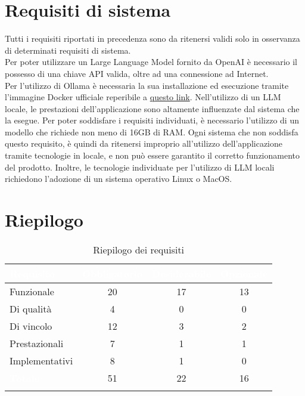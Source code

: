 \section{Requisiti di sistema}
Tutti i requisiti riportati in precedenza sono da ritenersi validi solo in osservanza di determinati requisiti di sistema.\\
Per poter utilizzare un Large Language Model fornito da OpenAI è necessario il possesso di una chiave API valida, oltre ad una connessione ad Internet.\\
Per l'utilizzo di Ollama è necessaria la sua installazione ed esecuzione tramite l'immagine Docker ufficiale reperibile a \href{https://ollama.ai/blog/ollama-is-now-available-as-an-official-docker-image}{questo link}.
Nell'utilizzo di un LLM locale, le prestazioni dell'applicazione sono altamente influenzate dal sistema che la esegue. Per poter soddisfare i requisiti individuati, è necessario l'utilizzo di un modello che richiede non meno di 16GB di RAM. Ogni sistema che non soddisfa questo requisito, è quindi da ritenersi improprio all'utilizzo dell'applicazione tramite tecnologie in locale, e non può essere garantito il corretto funzionamento del prodotto. Inoltre, le tecnologie individuate per l'utilizzo di LLM locali richiedono l'adozione di un sistema operativo Linux o MacOS.

\section{Riepilogo}
\begingroup
\setlength{\tabcolsep}{10pt}
\renewcommand{\arraystretch}{1.5}
\begin{xltabular}{\textwidth}{| X | c | c | c |}
    \hline
     \textbf{\textcolor{white}{Requisito}} & \textbf{\textcolor{white}{Obbligatorio}} & \textbf{\textcolor{white}{Desiderabile}} & \textbf{\textcolor{white}{Opzionale}}\\
    \hline
    \endhead
    Funzionale & 20 & 17 & 13 \\
    \hline
    Di qualità & 4 & 0 & 0 \\
    \hline
    Di vincolo & 12 & 3 & 2 \\
    \hline
    Prestazionali & 7 & 1 & 1 \\
    \hline
    Implementativi & 8 & 1 & 0 \\
    \hline
     \textbf{\textcolor{white}{Totale}} & 51 & 22 & 16 \\
    \hline
     \caption{Riepilogo dei requisiti}
    \label{tab:riepilogo}
\end{xltabular}
\endgroup

